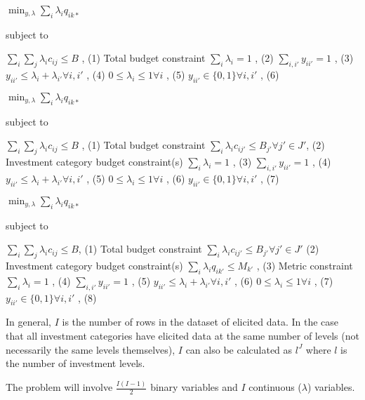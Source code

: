 \documentclass[letterpaper,10pt,english]{sphinxmanual}
\begin{document}

\(\min_{y, \lambda} \sum_i \lambda_{i}q_{ik*}\)

subject to

\(\sum_i \sum_j \lambda_{i}c_{ij} \leq B\) , (1) Total budget constraint
\(\sum_i \lambda_i = 1\) , (2)
\(\sum_{i,i'} y_{ii'} = 1\) , (3)
\(y_{ii'} \leq \lambda_i + \lambda_{i'} \forall i, i'\) , (4)
\(0 \leq \lambda_i \leq 1 \forall i\) , (5)
\(y_{ii'} \in \{ 0, 1 \} \forall i, i'\) , (6)


\(\min_{y, \lambda} \sum_i \lambda_{i}q_{ik*}\)

subject to

\(\sum_i \sum_j \lambda_{i}c_{ij} \leq B\) , (1) Total budget constraint
\(\sum_i \lambda_{i}c_{ij'} \leq B_{j'} \forall j' \in J'\),   (2) Investment category budget constraint(s)
\(\sum_i \lambda_i = 1\) , (3)
\(\sum_{i,i'} y_{ii'} = 1\) , (4)
\(y_{ii'} \leq \lambda_i + \lambda_{i'} \forall i, i'\) , (5)
\(0 \leq \lambda_i \leq 1 \forall i\) , (6)
\(y_{ii'} \in \{ 0, 1 \} \forall i, i'\) , (7)


\(\min_{y, \lambda} \sum_i \lambda_{i}q_{ik*}\)

subject to

\(\sum_i \sum_j \lambda_{i}c_{ij} \leq B\), (1) Total budget constraint
\(\sum_i \lambda_{i}c_{ij'} \leq B_{j'} \forall j' \in J'\)   (2) Investment category budget constraint(s)
\(\sum_i \lambda_{i}q_{ik'} \leq M_{k'}\) , (3) Metric constraint
\(\sum_i \lambda_i = 1\) , (4)
\(\sum_{i,i'} y_{ii'} = 1\) , (5)
\(y_{ii'} \leq \lambda_i + \lambda_{i'} \forall i, i'\) , (6)
\(0 \leq \lambda_i \leq 1 \forall i\) , (7)
\(y_{ii'} \in \{ 0, 1 \} \forall i, i'\) , (8)


In general, \(I\) is the number of rows in the dataset of elicited data. In the case that all investment categories have elicited data at the same number of levels (not necessarily the same levels themselves), \(I\) can also be calculated as \(l^J\) where \(l\) is the number of investment levels.

The problem will involve \(\frac{I(I-1)}{2}\) binary variables and \(I\) continuous (\(\lambda\)) variables.
\end{document}
